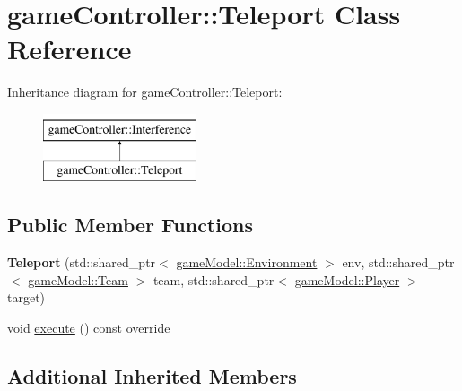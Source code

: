 \hypertarget{classgame_controller_1_1_teleport}{\section{game\-Controller\-:\-:Teleport Class Reference}
\label{classgame_controller_1_1_teleport}
}
Inheritance diagram for game\-Controller\-:\-:Teleport\-:\begin{figure}[H]
\begin{center}
\leavevmode
\includegraphics[height=2.000000cm]{classgame_controller_1_1_teleport}
\end{center}
\end{figure}
\subsection*{Public Member Functions}
\begin{DoxyCompactItemize}
\item 
\hypertarget{classgame_controller_1_1_teleport_ad427f67456586b006eb15142a96435df}{{\bfseries Teleport} (std\-::shared\-\_\-ptr$<$ \hyperlink{classgame_model_1_1_environment}{game\-Model\-::\-Environment} $>$ env, std\-::shared\-\_\-ptr$<$ \hyperlink{classgame_model_1_1_team}{game\-Model\-::\-Team} $>$ team, std\-::shared\-\_\-ptr$<$ \hyperlink{classgame_model_1_1_player}{game\-Model\-::\-Player} $>$ target)}\label{classgame_controller_1_1_teleport_ad427f67456586b006eb15142a96435df}

\item 
void \hyperlink{classgame_controller_1_1_teleport_a9e10c37934bf7447f1cee64545fbf138}{execute} () const override
\end{DoxyCompactItemize}
\subsection*{Additional Inherited Members}


